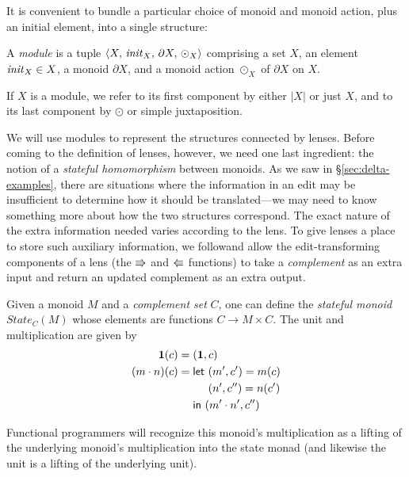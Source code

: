 It is convenient to bundle a particular choice of monoid and monoid
action, plus an initial element, into a single structure:

\begin{defn}
    A \emph{module} is a tuple $\left<X,\, \mathit{init}_X,\, \partial
    X,\,\odot_X\right>$ comprising a set $X$, an element $\mathit{init}_X\in X$, a monoid 
    $\partial X$, and a monoid action $\odot_X$ of $\partial X$ on $X$.
\end{defn}
If $X$ is a module, we refer to its first component by either
$|X|$ or just $X$, and to its last component by $\odot$ or simple
juxtaposition.

We will use modules to represent the structures connected by lenses.  Before
coming to the definition of lenses, however, we need one last ingredient:
the notion of a {\em stateful homomorphism} between monoids.  As we saw in
\S \ref{sec:delta-examples}, there are situations where the information in an
edit may be insufficient to determine how it should be translated---we may
need to know something more about how the two structures correspond. The
exact nature of the extra information needed varies according to the lens.
%
To give lenses a place to store such auxiliary information, we
follow\symmlenses and allow the edit-transforming
components of a lens (the $\mathord{\Rrightarrow}$ and $\mathord{\Lleftarrow}$ functions) to take a {\em
  complement} as an extra input and return an updated complement as an extra
output.
%
\iflater
{}  
\fi

\iffull
\begin{defn}
    Given a monoid $M$ and a {\em complement set} $C$, one can define the
    \emph{stateful monoid} $\mathit{State}_C(M)$ whose elements are
    functions $C \to M \times C$. The unit and multiplication are given by
    \begin{align*}
        \ONE(c) ={}& (\ONE,c) \\
        (m \cdot n)(c) ={}& \mllet (m',c') = m(c) \\
        & \phantom{\mllet} (n',c'') = n(c') \\
        & \mlinb (m' \cdot n',c'')
    \end{align*}
\end{defn}
Functional programmers will recognize this monoid's multiplication as a
lifting of the underlying monoid's multiplication into the state monad (and
likewise the unit is a lifting of the underlying unit).

